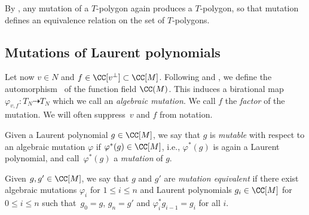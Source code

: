 	By \cite[Proposition 3.6]{AkhtarKasprzyk}, any mutation of a $T$-polygon again produces a $T$-polygon, so that mutation defines an equivalence relation on the set of $T$-polygons.
	\subsection{Mutations of Laurent polynomials}\label{sec:mutationsofLaurent}
	Let now $v \in N$ and $f \in \CC[v^\perp] \subset \CC[M]$. Following \cite{GrossHackingKeelClusterAlgebras} and \cite{AkhtarCoatesCorti}, we define the automorphism~
	of the function field $\CC(M)$. This
 induces a birational map
${\varphi_{v,f} \colon T_N \dashrightarrow T_N}$
	which we call an \emph{algebraic mutation}. We call $f$ the \emph{factor} of the mutation. We will often suppress~$v$ and $f$ from notation.
	\begin{Definition}\label{def:AlgebraicMutation}
		Given a Laurent polynomial $g \in \CC[M]$, we say that $g$ is {\it mutable} with respect to an algebraic mutation $\varphi$ if $\varphi^*(g)\in \CC[M]$, i.e., $\varphi^*(g)$ is again a Laurent polynomial, and call~$\varphi^*(g)$ a \emph{mutation} of $g$.

		Given $g, g' \in \CC[M]$, we say that $g$ and $g'$ are \emph{mutation equivalent} if there exist algebraic mutations $\varphi_i$ for $1 \leq i \leq n$ and Laurent polynomials $g_i \in \CC[M]$ for $0 \leq i \leq n$ such that~${g_0=g}$, ${g_n=g'}$ and $\varphi_i^*g_{i-1}=g_{i}$ for all $i$.
	\end{Definition}

